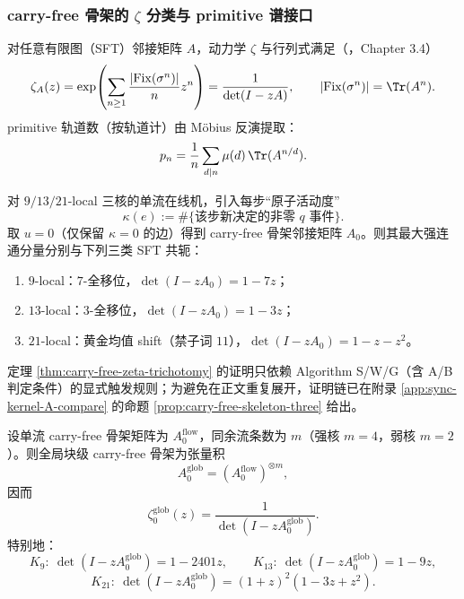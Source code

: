 \subsubsection{carry-free 骨架的 \texorpdfstring{$\zeta$}{zeta} 分类与 primitive 谱接口}
对任意有限图（SFT）邻接矩阵 $A$，动力学 $\zeta$ 与行列式满足（\cite{BrinStuck2002}，Chapter 3.4）
\[
\zeta_A(z)=\exp\!\left(\sum_{n\ge 1}\frac{|\mathrm{Fix}(\sigma^n)|}{n}z^n\right)=\frac{1}{\det(I-zA)},
\qquad
|\mathrm{Fix}(\sigma^n)|=\Tr(A^n).
\]
primitive 轨道数（按轨道计）由 Möbius 反演提取：
\[
p_n=\frac{1}{n}\sum_{d\mid n}\mu(d)\,\Tr(A^{n/d}).
\]

\begin{theorem}\label{thm:carry-free-zeta-trichotomy}
对 $9/13/21$-local 三核的单流在线机，引入每步“原子活动度”
\[
\kappa(e):=\#\{\text{该步新决定的非零 }q\text{ 事件}\}.
\]
取 $u=0$（仅保留 $\kappa=0$ 的边）得到 carry-free 骨架邻接矩阵 $A_0$。则其最大强连通分量分别与下列三类 SFT 共轭：
\begin{enumerate}
  \item $9$-local：$7$-全移位，$\det(I-zA_0)=1-7z$；
  \item $13$-local：$3$-全移位，$\det(I-zA_0)=1-3z$；
  \item $21$-local：黄金均值 shift（禁子词 $11$），$\det(I-zA_0)=1-z-z^2$。
\end{enumerate}
\end{theorem}

\begin{remark}[可审计证明位置]
定理 \ref{thm:carry-free-zeta-trichotomy} 的证明只依赖 Algorithm S/W/G（含 A/B 判定条件）的显式触发规则；为避免在正文重复展开，证明链已在附录 \ref{app:sync-kernel-A-compare} 的命题 \ref{prop:carry-free-skeleton-three} 给出。
\end{remark}

\begin{corollary}\label{cor:global-assembly-zeta}
设单流 carry-free 骨架矩阵为 $A_0^{\mathrm{flow}}$，同余流条数为 $m$（强核 $m=4$，弱核 $m=2$）。则全局块级 carry-free 骨架为张量积
\[
A_0^{\mathrm{glob}}=(A_0^{\mathrm{flow}})^{\otimes m},
\]
因而
\[
\zeta^{\mathrm{glob}}_0(z)=\frac{1}{\det(I-zA_0^{\mathrm{glob}})}.
\]
特别地：
\[
K_9:\ \det(I-zA_0^{\mathrm{glob}})=1-2401z,\qquad
K_{13}:\ \det(I-zA_0^{\mathrm{glob}})=1-9z,
\]
\[
K_{21}:\ \det(I-zA_0^{\mathrm{glob}})=(1+z)^2(1-3z+z^2).
\]
\end{corollary}

